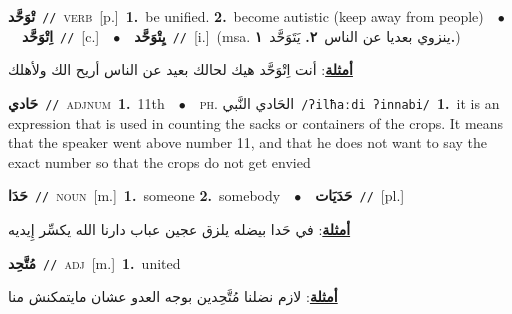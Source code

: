 \documentclass[10pt,a4paper,twoside]{article} %
\begin{document}
\begin{multicols}{2}
{\setlength\topsep{0pt}\textbf{\foreignlanguage{arabic}{تْوَحَّد}}\ {\color{gray}\texttt{//}\color{black}}\ \textsc{verb}\ [p.]\ \textbf{1.}~be unified.  \textbf{2.}~become autistic (keep away from people)\ \ $\bullet$\ \ \setlength\topsep{0pt}\textbf{\foreignlanguage{arabic}{اِتْوَحَّد}}\ {\color{gray}\texttt{//}\color{black}}\ [c.]\ \ $\bullet$\ \ \setlength\topsep{0pt}\textbf{\foreignlanguage{arabic}{يِتْوَحَّد}}\ {\color{gray}\texttt{//}\color{black}}\ [i.]\ \color{gray}(msa. \foreignlanguage{arabic}{ينزوي بعديا عن الناس}~\foreignlanguage{arabic}{\textbf{٢.}}  \foreignlanguage{arabic}{يَتَوَحَّد}~\foreignlanguage{arabic}{\textbf{١.}})\color{black}\  \begin{flushright}\color{gray}\foreignlanguage{arabic}{\textbf{\underline{\foreignlanguage{arabic}{أمثلة}}}: أنت اِتْوَحَّد هيك لحالك بعيد عن الناس أريح الك ولأهلك}\end{flushright}\color{black}} \vspace{2mm}

{\setlength\topsep{0pt}\textbf{\foreignlanguage{arabic}{حَادي}}\ {\color{gray}\texttt{//}\color{black}}\ \textsc{adj\textunderscore num}\ \textbf{1.}~11th\ \ $\bullet$\ \ \textsc{ph.} \color{gray} \foreignlanguage{arabic}{الحَادي النَّبي}\color{black}\ {\color{gray}\texttt{/{\sffamily ʔilħaːdi ʔinnabi}/}\color{black}}\ \textbf{1.}~it is an expression that is used in counting the sacks or containers of the crops. It means that the speaker went above number 11, and that he does not want to say the exact number so that the crops do not get envied\ } \vspace{2mm}

{\setlength\topsep{0pt}\textbf{\foreignlanguage{arabic}{حَدَا}}\ {\color{gray}\texttt{//}\color{black}}\ \textsc{noun}\ [m.]\ \textbf{1.}~someone  \textbf{2.}~somebody\ \ $\bullet$\ \ \setlength\topsep{0pt}\textbf{\foreignlanguage{arabic}{حَدَيَات}}\ {\color{gray}\texttt{//}\color{black}}\ [pl.]\  \begin{flushright}\color{gray}\foreignlanguage{arabic}{\textbf{\underline{\foreignlanguage{arabic}{أمثلة}}}: في حَدا بيضله يلزق عجين عباب دارنا الله يكسِّر إِيديه}\end{flushright}\color{black}} \vspace{2mm}

{\setlength\topsep{0pt}\textbf{\foreignlanguage{arabic}{مُتَّحِد}}\ {\color{gray}\texttt{//}\color{black}}\ \textsc{adj}\ [m.]\ \textbf{1.}~united\  \begin{flushright}\color{gray}\foreignlanguage{arabic}{\textbf{\underline{\foreignlanguage{arabic}{أمثلة}}}: لازم نضلنا مُتَّحِدين بوجه العدو عشان مايتمكنش منا}\end{flushright}\color{black}} \vspace{2mm}


\end{multicols}
\end{document}
